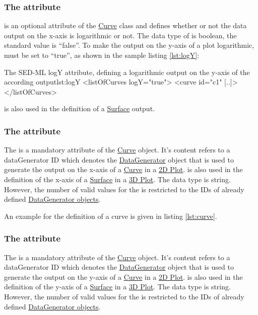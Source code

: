\subsubsection{The  attribute}
\label{sec:logY}
 is an optional attribute of the \hyperref[class:curve]{Curve} class and defines whether or not the data output on the x-axis is logarithmic or not. The data type of  is boolean, the standard value is ``false''.
To make the output on the y-axis of a plot logarithmic,  must be set to ``true'', as shown in the sample listing \ref{lst:logY}: 
\begin{myXmlLst}{The SED-ML  logY attribute, defining a logarithmic output on the y-axis of the according output}{lst:logY}
<listOfCurves logY="true">
  <curve id="c1" [..]>
</listOfCurves>
\end{myXmlLst}
 is also used in the definition of a \hyperref[class:surface]{Surface} output.

\subsubsection{The  attribute}
\label{sec:xDataReference}
The  is a mandatory attribute of the \hyperref[class:curve]{Curve} object. It's content refers to a dataGenerator ID which denotes the \hyperref[class:dataGenerator]{DataGenerator} object that is used to generate the output on the x-axis of a \hyperref[class:curve]{Curve} in a \hyperref[class:2DPlot]{2D Plot}. 
 is also used in the definition of the x-axis of a \hyperref[class:surface]{Surface} in a \hyperref[class:3DPlot]{3D Plot}.
The  data type is string. However, the number of valid values for the  is restricted to the IDs of already defined \hyperref[class:dataGenerator]{DataGenerator objects}.

An example for the definition of a curve is given in listing \ref{lst:curve}.

\subsubsection{The  attribute}
\label{sec:yDataReference}
The  is a mandatory attribute of the \hyperref[class:curve]{Curve} object. It's content refers to a dataGenerator ID which denotes the \hyperref[class:dataGenerator]{DataGenerator} object that is used to generate the output on the y-axis of a \hyperref[class:curve]{Curve} in a \hyperref[class:2DPlot]{2D Plot}.
 is also used in the definition of the y-axis of a \hyperref[class:surface]{Surface} in a \hyperref[class:3DPlot]{3D Plot}.
The  data type is string. However, the number of valid values for the  is restricted to the IDs of already defined \hyperref[class:dataGenerator]{DataGenerator objects}.

